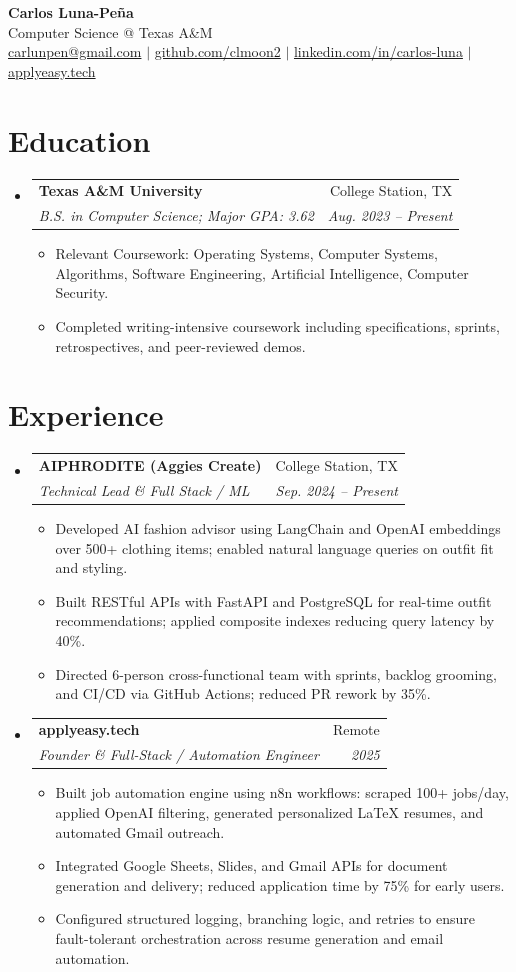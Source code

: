 \documentclass[letterpaper,11pt]{article}
\makeatletter
\newcommand{\resumeItem}[1]{
  \item\small{{#1 \vspace{-2pt}}}
}
\newcommand{\resumeSubheading}[4]{
  \vspace{-2pt}\item
    \begin{tabular*}{0.97\textwidth}[t]{l@{\extracolsep{\fill}}r}
      \textbf{#1} & #2 \\
      \textit{\small#3} & \textit{\small #4} \\
    \end{tabular*}\vspace{-7pt}
}
\newcommand{\resumeSubHeadingListStart}{\begin{itemize}[leftmargin=0.15in, label={}]}
\newcommand{\resumeSubHeadingListEnd}{\end{itemize}}
\newcommand{\resumeItemListStart}{\begin{itemize}}
\newcommand{\resumeItemListEnd}{\end{itemize}\vspace{-5pt}}
\makeatother
\begin{document}
\begin{center}
  \textbf{\Huge Carlos Luna-Pe\~na} \\
  \vspace{2pt}
  Computer Science @ Texas A\&M \\
  \vspace{1pt}
  \href{mailto:carlunpen@gmail.com}{carlunpen@gmail.com} $|$ \href{https://github.com/clmoon2}{github.com/clmoon2} $|$ \href{https://linkedin.com/in/carlos-luna}{linkedin.com/in/carlos-luna} $|$ \href{https://applyeasy.tech}{applyeasy.tech}
\end{center}

\section{Education}
\resumeSubHeadingListStart
  \resumeSubheading
    {Texas A\&M University}{College Station, TX}
    {B.S. in Computer Science; Major GPA: 3.62}{Aug. 2023 -- Present}
    \resumeItemListStart
      \resumeItem{Relevant Coursework: Operating Systems, Computer Systems, Algorithms, Software Engineering, Artificial Intelligence, Computer Security.}
      \resumeItem{Completed writing-intensive coursework including specifications, sprints, retrospectives, and peer-reviewed demos.}
    \resumeItemListEnd
\resumeSubHeadingListEnd

\section{Experience}
\resumeSubHeadingListStart
  \resumeSubheading
    {AIPHRODITE (Aggies Create)}{College Station, TX}
    {Technical Lead \& Full Stack / ML}{Sep. 2024 -- Present}
    \resumeItemListStart
      \resumeItem{Developed AI fashion advisor using LangChain and OpenAI embeddings over 500+ clothing items; enabled natural language queries on outfit fit and styling.}
      \resumeItem{Built RESTful APIs with FastAPI and PostgreSQL for real-time outfit recommendations; applied composite indexes reducing query latency by 40\%.}
      \resumeItem{Directed 6-person cross-functional team with sprints, backlog grooming, and CI/CD via GitHub Actions; reduced PR rework by 35\%.}
    \resumeItemListEnd

  \resumeSubheading
    {applyeasy.tech}{Remote}
    {Founder \& Full-Stack / Automation Engineer}{2025}
    \resumeItemListStart
      \resumeItem{Built job automation engine using n8n workflows: scraped 100+ jobs/day, applied OpenAI filtering, generated personalized LaTeX resumes, and automated Gmail outreach.}
      \resumeItem{Integrated Google Sheets, Slides, and Gmail APIs for document generation and delivery; reduced application time by 75\% for early users.}
      \resumeItem{Configured structured logging, branching logic, and retries to ensure fault-tolerant orchestration across resume generation and email automation.}
    \resumeItemListEnd
\resumeSubHeadingListEnd
\end{document}
